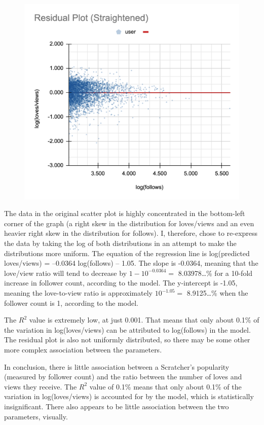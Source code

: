 \documentclass[12pt]{article}
\begin{document}
\begin{flushleft}
	\newpage
	\begin{figure}[h]
		\includegraphics[width=\linewidth]{img/plot3.png}
		\centering
	\end{figure}
	
	The data in the original scatter plot is highly concentrated in the bottom-left corner of the graph (a right skew in the distribution for loves/views and an even heavier right skew in the distribution for follows). I, therefore, chose to re-express the data by taking the log of both distributions in an attempt to make the distributions more uniform. The equation of the regression line is log(predicted loves/views) = –0.0364 log(follows) – 1.05. The slope is -0.0364, meaning that the love/view ratio will tend to decrease by $1-10^{-0.0364}=$ 8.03978…\% for a 10-fold increase in follower count, according to the model. The y-intercept is -1.05, meaning the love-to-view ratio is approximately $10^{-1.05}=$ 8.9125…\% when the follower count is 1, according to the model.
	
	The $R^2$ value is extremely low, at just 0.001. That means that only about 0.1\% of the variation in log(loves/views) can be attributed to log(follows) in the model. The residual plot is also not uniformly distributed, so there may be some other more complex association between the parameters.
	
	In conclusion, there is little association between a Scratcher’s popularity (measured by follower count) and the ratio between the number of loves and views they receive. The $R^2$ value of 0.1\% means that only about 0.1\% of the variation in log(loves/views) is accounted for by the model, which is statistically insignificant. There also appears to be little association between the two parameters, visually.
	
\end{flushleft}
\end{document}
